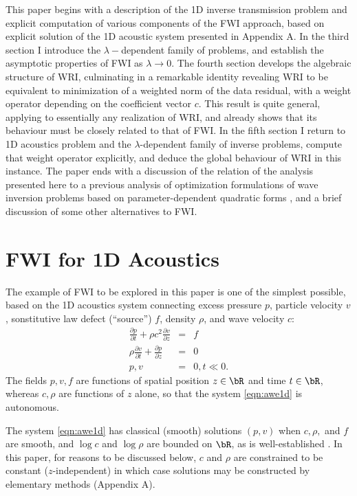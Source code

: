 This paper begins with a description of the 1D inverse transmission
problem and explicit computation of various components of the FWI
approach, based on explicit solution of the 1D acoustic system
presented in Appendix A. In the third section I introduce the $\lambda-$dependent
family of problems, and establish the asymptotic properties of FWI as
$\lambda \rightarrow 0$. The fourth section develops the algebraic
structure of WRI, culminating in a remarkable identity revealing WRI
to be equivalent to minimization of a weighted norm of the data
residual, with a weight operator depending on the coefficient vector
$c$. This result is quite general, applying to essentially any
realization of WRI, and already shows that its behaviour must be
closely related to that of FWI. In the fifth section I return to 
1D acoustics problem and the $\lambda$-dependent family of inverse
problems, compute that weight operator explicitly, and deduce the
global behaviour of WRI in this instance. The paper ends with a
discussion of the relation of the analysis presented here to a
previous analysis of optimization formulations of wave inversion
problems based on parameter-dependent quadratic forms
\cite[]{StolkSymes:03}, and a brief discussion of some other
alternatives to FWI.

\section{FWI for 1D Acoustics}
The example of FWI to be explored in this paper is one of the simplest possible, based on the 1D acoustics system connecting excess pressure $p$, particle velocity $v$, sonstitutive law defect (``source'') $f$, density $\rho$, and wave velocity $c$:
\begin{eqnarray}
\label{eqn:awe1d}
\frac{\partial p}{\partial t} + \rho c^2\frac{\partial 
  v}{\partial z} &=& f \nonumber\\
\rho \frac{\partial v}{\partial t} + \frac{\partial p}{\partial 
  z}&=&0\nonumber\\
 p,v&=&0, t \ll 0. 
\end{eqnarray}
The fields $p,v,f$ are functions of spatial position $z \in \bR$ and time $t \in \bR$, whereas $c, \rho$ are functions of $z$ alone, so that the system \ref{eqn:awe1d} is autonomous.

The system \ref{eqn:awe1d} has classical (smooth) solutions $(p,v)$
when $c, \rho,$ and $f$ are smooth, and $\log c$ and $\log \rho$ are
bounded on $\bR$, as is well-established \cite[]{Lax:PDENotes}. In
this paper, for reasons to be discussed below, $c$ and $\rho$ are
constrained to be constant ($z$-independent) in which case solutions
may be constructed by elementary methods (Appendix A). 

